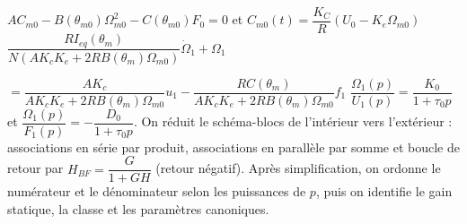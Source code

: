 \begin{corrigebox}[Corrigé]
$AC_{m0}-B\left( \theta_{m0}\right) \Omega_{m0}^2-C\left( \theta_{m0}\right)F_0 = 0 $ et $C_{m0}(t)=\dfrac{K_C}{R}\left(U_0-K_e\Omega_{m0}\right)$
$\dfrac{RI_{eq}\left( \theta_m\right)}{N\left( AK_cK_e+2RB\left( \theta_m\right)\Omega_{m0}\right)} \dot{\Omega}_1+\Omega_1 $

 $= 
\dfrac{AK_c}{ AK_cK_e+2RB\left( \theta_m\right)\Omega_{m0}} u_1
- \dfrac{RC\left( \theta_m\right)}{ AK_cK_e+2RB\left( \theta_m\right)\Omega_{m0}} f_1$
$\dfrac{\Omega_1(p)}{U_1(p)}=\dfrac{K_0}{1+\tau_0 p}$ et $\dfrac{\Omega_1(p)}{F_1(p)}=-\dfrac{D_0}{1+\tau_0 p}$.
On réduit le schéma-blocs de l'intérieur vers l'extérieur : associations en série par produit, associations en parallèle par somme et boucle de retour par $H_{BF}=\dfrac{G}{1+GH}$ (retour négatif). Après simplification, on ordonne le numérateur et le dénominateur selon les puissances de $p$, puis on identifie le gain statique, la classe et les paramètres canoniques.
\end{corrigebox}
